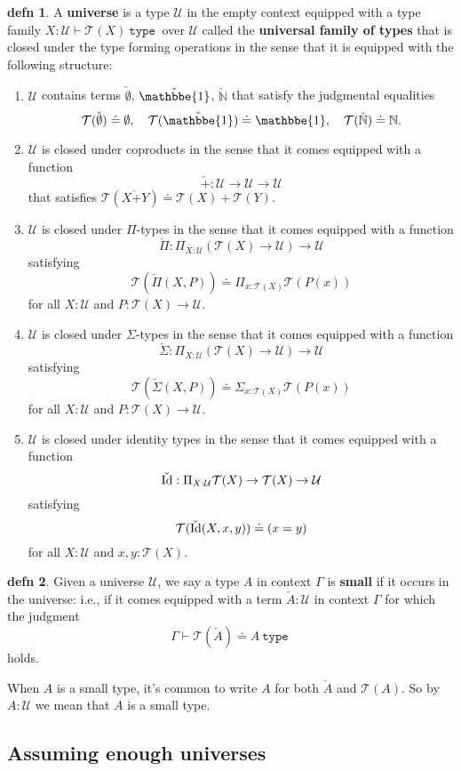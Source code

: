 \documentclass{amsart}
\theoremstyle{theorem}
\theoremstyle{definition}
\newtheorem*{defn}{defn}
\theoremstyle{remark}
\newcommand{\0}{\mathbbe{0}}
\newcommand{\1}{\mathbbe{1}}
\newcommand{\2}{\mathbbe{2}}
\newcommand{\3}{\mathbbe{3}}
\newcommand{\4}{\mathbbe{4}}
\newcommand{\univ}{{~\texttt{type}~}}
\newcommand{\bN}{{\mathbb{N}}}
\newcommand{\UU}{{\mathcal{U}}}
\newcommand{\sT}{\mathcal{T}}
\newcommand{\Id}{\textup{\text{Id}}}
\begin{document}
\begin{defn} A \textbf{universe} is a type $\UU$ in the empty context equipped with a type family $X : \UU \vdash \sT(X) \univ$ over $\UU$ called the \textbf{universal family of types} that is closed under the type forming operations in the sense that it is equipped with the following structure:
\begin{enumerate}
\item $\UU$ contains terms $\check{\emptyset}$, $\check{\1}$, $\check{\bN}$ that satisfy the judgmental equalities
\[ \sT(\check{\emptyset}) \doteq \emptyset, \quad \sT(\check{\1}) \doteq \1, \quad \sT(\check{\bN}) \doteq \bN.\]
\item $\UU$ is closed under coproducts in the sense that it comes equipped with a function
\[ \check{+} \colon \UU \to \UU \to \UU\] that satisfies $\sT(X\check{+}Y) \doteq \sT(X) + \sT(Y)$.
\item $\UU$ is closed under $\Pi$-types in the sense that it comes equipped with a function
\[ \check{\Pi} \colon \Pi_{X: \UU} (\sT(X) \to \UU) \to \UU\] satisfying
\[ \sT(\check{\Pi}(X,P)) \doteq \Pi_{x : \sT(X)} \sT(P(x))\]
for all $X : \UU$ and $P \colon \sT(X) \to \UU$.
\item $\UU$ is closed under $\Sigma$-types in the sense that it comes equipped with a function
\[ \check{\Sigma} \colon \Pi_{X: \UU} (\sT(X) \to \UU) \to \UU\] satisfying
\[ \sT(\check{\Sigma}(X,P)) \doteq \Sigma_{x : \sT(X)} \sT(P(x))\]
for all $X : \UU$ and $P \colon \sT(X) \to \UU$.
\item $\UU$ is closed under identity types in the sense that it comes equipped with a function
\[ \check{\Id} : \Pi_{X : \UU} \sT(X) \to \sT(X) \to \UU\]
satisfying
\[ \sT(\check{\Id}(X,x,y)) \doteq (x = y)\]
for all $X: \UU$ and $x,y : \sT(X)$.
\end{enumerate}
\end{defn} 

\begin{defn} Given a universe $\UU$, we say a type $A$ in context $\Gamma$ is \textbf{small} if it occurs in the universe: i.e., if it comes equipped with a term $\check{A} : \UU$ in context $\Gamma$ for which the judgment
\[ \Gamma \vdash \sT(\check{A}) \doteq A \univ\]
holds. 
\end{defn}

When $A$ is a small type, it's common to write $A$ for both $\check{A}$ and $\sT(A)$. So by $A : \UU$ we mean that $A$ is a small type.

\subsection*{Assuming enough universes}
\end{document}
